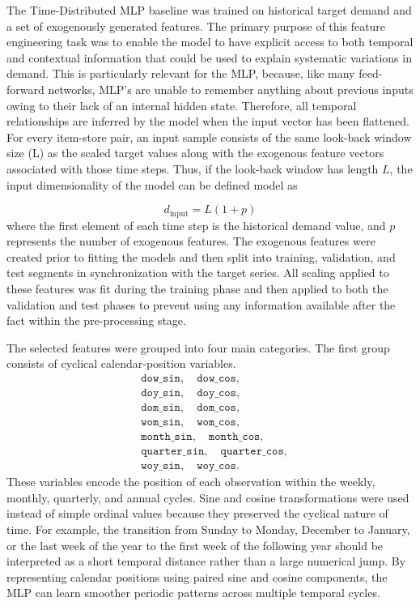 \label{subsec:mlp_feature_engineering}

The Time-Distributed MLP baseline was trained on historical target demand and a set of exogenously generated features. The primary purpose of this feature engineering task was to enable the model to have explicit access to both temporal and contextual information that could be used to explain systematic variations in demand. This is particularly relevant for the MLP, because, like many feed-forward networks, MLP's are unable to remember anything about previous inputs owing to their lack of an internal hidden state. Therefore, all temporal relationships are inferred by the model when the input vector has been flattened. For every item-store pair, an input sample consists of the same look-back window size (L) as the scaled target values along with the exogenous feature vectors associated with those time steps. Thus, if the look-back window has length \(L\), the input dimensionality of the model can be defined  model as

\[ d_{\text{input}} = L(1 + p) \]
where the first element of each time step is the historical demand value, and \(p\) represents the number of exogenous features. The exogenous features were created prior to fitting the models and then split into training, validation, and test segments in synchronization with the target series. All scaling applied to these features was fit during the training phase and then applied to both the validation and test phases to prevent using any information available after the fact within the pre-processing stage.

The selected features were grouped into four main categories. The first group consists of cyclical calendar-position variables.
\[
\begin{split}
&\texttt{dow\_sin},\quad \texttt{dow\_cos},\\
&\texttt{doy\_sin},\quad \texttt{doy\_cos},\\
&\texttt{dom\_sin},\quad \texttt{dom\_cos},\\
&\texttt{wom\_sin},\quad \texttt{wom\_cos},\\
&\texttt{month\_sin},\quad \texttt{month\_cos},\\
&\texttt{quarter\_sin},\quad \texttt{quarter\_cos},\\
&\texttt{woy\_sin},\quad \texttt{woy\_cos}.
\end{split}
\]
These variables encode the position of each observation within the weekly, monthly, quarterly, and annual cycles. Sine and cosine transformations were used instead of simple ordinal values because they preserved the cyclical nature of time. For example, the transition from Sunday to Monday, December to January, or the last week of the year to the first week of the following year should be interpreted as a short temporal distance rather than a large numerical jump. By representing calendar positions using paired sine and cosine components, the MLP can learn smoother periodic patterns across multiple temporal cycles.

